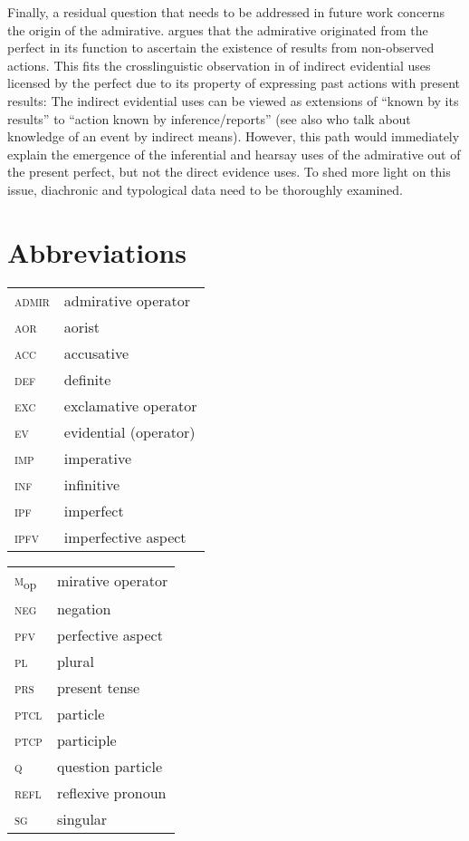 \documentclass[output=paper,
colorlinks,
citecolor=brown,
newtxmath
]{langscibook}
\begin{document}
Finally, a residual question that needs to be addressed in future work concerns the origin of the admirative. \citet{Nicolova2013} argues that the admirative originated from the perfect in its function to ascertain the existence of results from non-observed actions. This fits the crosslinguistic observation in \citet[73--74]{Bybee.Dahl1989} of indirect evidential uses licensed by the perfect due to its property of expressing past actions with present results: The indirect evidential uses can be viewed as extensions of ``known by its results'' to ``action known by inference/reports'' (see also \citet{Lau.Rooryck2017} who talk about knowledge of an event by indirect means). However, this path would immediately explain the emergence of the inferential and hearsay uses of the admirative out of the present perfect, but not the direct evidence uses. To shed more light on this issue, diachronic and typological data need to be thoroughly examined.

\section*{Abbreviations}
\begin{tabularx}{.45\textwidth}{lQ}
\textsc{admir} & admirative operator\\
\textsc{aor} & aorist\\
\textsc{acc} & accusative\\
\textsc{def} & definite\\
\textsc{exc} & exclamative operator\\
\textsc{ev} & evidential (operator)\\
\textsc{imp} & imperative\\
\textsc{inf} & infinitive\\
\textsc{ipf} & imperfect \\
\textsc{ipfv} & imperfective aspect\\
\end{tabularx}
\begin{tabularx}{.45\textwidth}{lQ}
\textsc{m}\textsubscript{op} & mirative operator \\
\textsc{neg} & negation\\
\textsc{pfv} & perfective aspect\\
\textsc{pl} & plural\\
\textsc{prs} & present tense\\
\textsc{ptcl} & particle\\
\textsc{ptcp} & participle\\
\textsc{q} & question particle\\
\textsc{refl} & reflexive pronoun\\
\textsc{sg} & singular\\
\end{tabularx}
\end{document}
